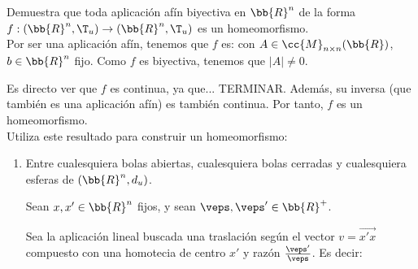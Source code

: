 \begin{ejercicio}
    Demuestra que toda aplicación afín biyectiva en $\bb{R}^n$ de la forma $f : (\bb{R}^n, \T_u) \to (\bb{R}^n, \T_u)$ es un homeomorfismo.\\

    Por ser una aplicación afín, tenemos que $f$ es:
    con $A\in \cc{M}_{n\times n}(\bb{R})$, $b\in \bb{R}^n$ fijo. Como $f$ es biyectiva, tenemos que $|A|\neq 0$.

    Es directo ver que $f$ es continua, ya que... TERMINAR. Además, su inversa (que también es una aplicación afín) es también continua. Por tanto, $f$ es un homeomorfismo.\\
    
    
    Utiliza este resultado para construir un homeomorfismo:
    \begin{enumerate}
        \item Entre cualesquiera bolas abiertas, cualesquiera bolas cerradas y cualesquiera esferas de $(\bb{R}^n, d_u)$.

        Sean $x,x'\in \bb{R}^n$ fijos, y sean $\veps,\veps'\in \bb{R}^+$.
        
        Sea la aplicación lineal buscada una traslación según el vector $v=\vec{x'x}$ compuesto con una homotecia de centro $x'$ y razón $\frac{\veps'}{\veps}$. Es decir:


\end{enumerate}
\end{ejercicio}
